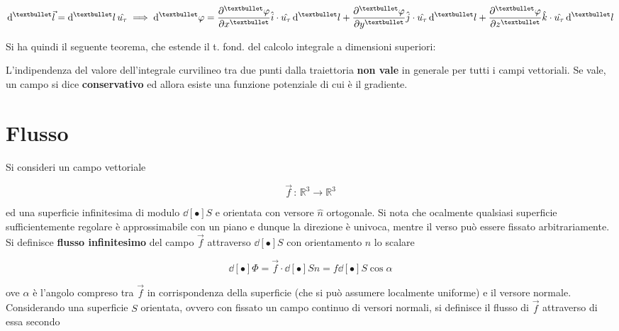\[\dd[•]{\vec{l}} = \dd[•]{l} \hat{u_\tau} \implies \dd[•]{\varphi} =  \pdv[•]{\varphi}{x} \hat{i} \cdot \hat{u_\tau} \dd[•]{l} + \pdv[•]{\varphi}{y} \hat{j} \cdot \hat{u_\tau} \dd[•]{l} + \pdv[•]{\varphi}{z} \hat{k} \cdot \hat{u_\tau} \dd[•]{l}\]

Si ha quindi il seguente teorema, che estende il t. fond. del calcolo integrale a dimensioni superiori:


L'indipendenza del valore dell'integrale curvilineo tra due punti dalla traiettoria \textbf{non vale} in generale per tutti i campi vettoriali. Se vale, un campo si dice \textbf{conservativo} ed allora esiste una funzione potenziale di cui è il gradiente.

\section{Flusso}

Si consideri un campo vettoriale

\[\vec{f} \, : \, \mathbb{R}^3 \rightarrow \mathbb{R}^3\]

ed una superficie infinitesima di modulo $\dd[•]{S}$ e orientata con versore $\hat{n}$ ortogonale. Si nota che ocalmente qualsiasi superficie sufficientemente regolare è approssimabile con un piano e dunque la direzione è univoca, mentre il verso può essere fissato arbitrariamente.
\\Si definisce \textbf{flusso infinitesimo} del campo $\vec{f}$ attraverso $\dd[•]{S}$ con orientamento $\hat{n}$ lo scalare

\[\dd[•]{\Phi} = \vec{f} \cdot \dd[•]{S} \hat{n} = f \dd[•]{S} \cos \alpha\]

ove $\alpha$ è l'angolo compreso tra $\vec{f}$ in corrispondenza della superficie (che si può assumere localmente uniforme) e il versore normale.
\\Considerando una superficie $S$ orientata, ovvero con fissato un campo continuo di versori normali, si definisce il flusso di $\vec{f}$ attraverso di essa secondo


